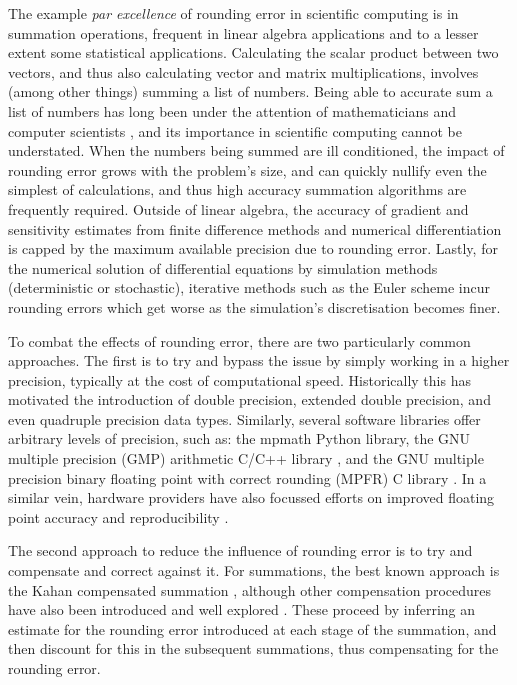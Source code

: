 \documentclass[9pt,a4paper,english]{extarticle}
\begin{document}
The example \textit{par excellence} of rounding error in scientific computing is in summation operations, frequent in linear algebra applications and to a lesser extent some statistical applications. Calculating the scalar product between two vectors, and thus also calculating vector and matrix multiplications, involves (among other things) summing a list of numbers. Being able to accurate sum a list of numbers has long been under the attention of mathematicians and computer scientists \citep{knuth2014art,kahan1965further,higham1993accuracy,trefethen1997numerical}, and its importance in scientific computing cannot be understated. When the numbers being summed are ill conditioned, the impact of rounding error grows with the problem's size, and can quickly nullify even the simplest of calculations, and thus high accuracy summation algorithms are frequently required. Outside of linear algebra, the accuracy of gradient and sensitivity estimates from finite difference methods and numerical differentiation is capped by the maximum available precision due to rounding error. Lastly, for the numerical solution of differential equations by simulation methods (deterministic or stochastic), iterative methods such as the Euler scheme incur rounding errors which get worse as the simulation's discretisation becomes finer. 

To combat the effects of rounding error, there are two particularly common approaches. The first is to try and bypass the issue by simply working in a higher precision, typically at the cost of computational speed. Historically this has motivated the introduction of double precision, extended double precision, and even quadruple precision data types. Similarly, several software libraries offer arbitrary levels of precision, such as: the mpmath \citep{mpmath} Python library, the GNU
multiple precision (GMP) arithmetic C/C++ library \citep{granlund2012gmp}, and the GNU multiple precision binary floating point with correct rounding (MPFR) C library \citep{fousse2007MPFR}. In a similar vein, hardware providers have also focussed efforts on improved floating point accuracy and reproducibility  \citep{burgess2018high}.

The second approach to reduce the influence of rounding error is to try and compensate and correct against it. For summations, the best known approach is the Kahan compensated summation \citep{kahan1965further}, although other compensation procedures have also been introduced and well explored \citep{moller1965quasi,knuth2014art,dekker1971floating,neumaier1974rounding,babuska1968numerical,klein2006generalised,linz1970floating,ogita2005accurate}. These proceed by inferring an estimate for the rounding error introduced at each stage of the summation, and then discount for this in the subsequent summations, thus compensating for the rounding error. 
\end{document}
